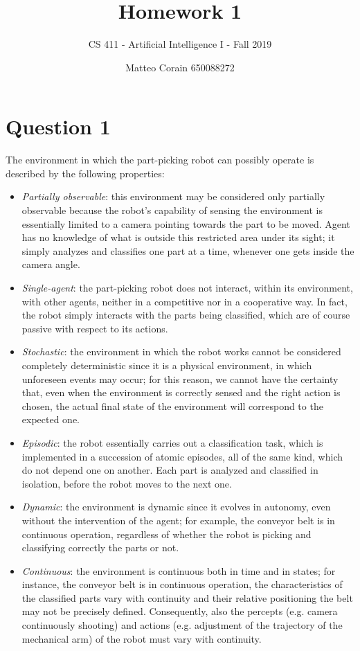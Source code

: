 \documentclass[letterpaper,headings=standardclasses]{scrartcl}
\title{Homework 1}
\subtitle{CS 411 - Artificial Intelligence I - Fall 2019}
\author{Matteo Corain 650088272}
\begin{document}
\maketitle

\section{Question 1}

The environment in which the part-picking robot can possibly operate is described by the following properties:

\begin{itemize}

\item \emph{Partially observable}: this environment may be considered only partially observable because the robot's capability of sensing the environment is essentially limited to a camera pointing towards the part to be moved. Agent has no knowledge of what is outside this restricted area under its sight; it simply analyzes and classifies one part at a time, whenever one gets inside the camera angle.

\item \emph{Single-agent}: the part-picking robot does not interact, within its environment, with other agents, neither in a competitive nor in a cooperative way. In fact, the robot simply interacts with the parts being classified, which are of course passive with respect to its actions.

\item \emph{Stochastic}: the environment in which the robot works cannot be considered completely deterministic since it is a physical environment, in which unforeseen events may occur; for this reason, we cannot have the certainty that, even when the environment is correctly sensed and the right action is chosen, the actual final state of the environment will correspond to the expected one.

\item \emph{Episodic}: the robot essentially carries out a classification task, which is implemented in a succession of atomic episodes, all of the same kind, which do not depend one on another. Each part is analyzed and classified in isolation, before the robot moves to the next one.

\item \emph{Dynamic}: the environment is dynamic since it evolves in autonomy, even without the intervention of the agent; for example, the conveyor belt is in continuous operation, regardless of whether the robot is picking and classifying correctly the parts or not.

\item \emph{Continuous}: the environment is continuous both in time and in states; for instance, the conveyor belt is in continuous operation, the characteristics of the classified parts vary with continuity and their relative positioning the belt may not be precisely defined. Consequently, also the percepts (e.g. camera continuously shooting) and actions (e.g. adjustment of the trajectory of the mechanical arm) of the robot must vary with continuity.

\end{itemize}
\end{document}
